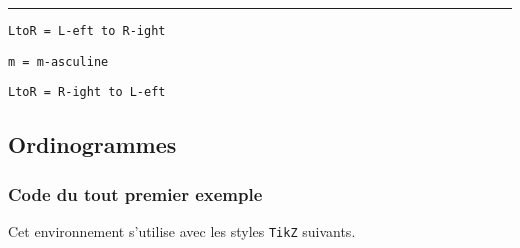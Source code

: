 \documentclass[12pt,a4paper]{article}
\theoremstyle{definition}
\newcommand\separation{
    \medskip
    \hfill\rule{0.5\textwidth}{0.75pt}\hfill
    \medskip
}
\newcommand\extraspace{
    \vspace{0.25em}
}
\newcommand\mwhyprefix[2]{%
    \texttt{#1 = #1-#2}%
}
\newcommand\prefix[1]{%
    \texttt{#1}%
}
\begin{document}




\separation


    \hfill \prefix{LtoR = L-eft to R-ight}

   \hfill \mwhyprefix{m}{asculine}

\extraspace

    \hfill \prefix{LtoR = R-ight to L-eft}





















\subsection{Ordinogrammes}

\subsubsection{Code du tout premier exemple} 




Cet environnement s'utilise avec les styles \verb#TikZ# suivants.
\end{document}
